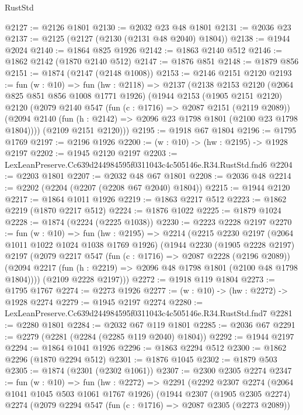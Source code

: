 \begin{lexlean}{RustStd}
\begin{coremodule}
@2127 := @2126 @1801
@2130 := @2032 @23 @48 @1801
@2131 := @2036 @23
@2137 := @2125 (@2127 (@2130 (@2131 @48 @2040) @1804))
@2138 := @1944 @2024
@2140 := @1864 @825 @1926
@2142 := @1863 @2140 @512
@2146 := @1862 @2142 (@1870 @2140 @512)
@2147 := @1876 @851
@2148 := @1879 @856
@2151 := @1874 (@2147 (@2148 @1008))
@2153 := @2146 @2151 @2120
@2193 := fun (w : @10) =>
  fun (hw : @2118) =>
  @2137
    (@2138
      @2153
      @2120
      (@2064 @825 @851 @856 @1008 @1771 @1926)
      (@1944
        @2153
        (@1905 @2151 @2120)
        @2120
        (@2079
          @2140
          @547
          (fun (c : @1716) => @2087 @2151 (@2119 @2089))
          (@2094 @2140 (fun (h : @2142) => @2096 @23 @1798 @1801 (@2100 @23 @1798 @1804))))
        (@2109 @2151 @2120)))
@2195 := @1918 @67 @1804
@2196 := @1795 @1769
@2197 := @2196 @1926
@2200 := (w : @10) -> (hw : @2195) -> @1928 @2197
@2202 := @1945 @2120 @2197
@2203 := LexLeanPreserve.Cc639d244984595f0311043c4c505146e.R34.RustStd.fnd6
@2204 := @2203 @1801
@2207 := @2032 @48 @67 @1801
@2208 := @2036 @48
@2214 := @2202 (@2204 (@2207 (@2208 @67 @2040) @1804))
@2215 := @1944 @2120
@2217 := @1864 @1011 @1926
@2219 := @1863 @2217 @512
@2223 := @1862 @2219 (@1870 @2217 @512)
@2224 := @1876 @1022
@2225 := @1879 @1024
@2228 := @1874 (@2224 (@2225 @1038))
@2230 := @2223 @2228 @2197
@2270 := fun (w : @10) =>
  fun (hw : @2195) =>
  @2214
    (@2215
      @2230
      @2197
      (@2064 @1011 @1022 @1024 @1038 @1769 @1926)
      (@1944
        @2230
        (@1905 @2228 @2197)
        @2197
        (@2079
          @2217
          @547
          (fun (c : @1716) => @2087 @2228 (@2196 @2089))
          (@2094 @2217 (fun (h : @2219) => @2096 @48 @1798 @1801 (@2100 @48 @1798 @1804))))
        (@2109 @2228 @2197)))
@2272 := @1918 @119 @1804
@2273 := @1795 @1767
@2274 := @2273 @1926
@2277 := (w : @10) -> (hw : @2272) -> @1928 @2274
@2279 := @1945 @2197 @2274
@2280 := LexLeanPreserve.Cc639d244984595f0311043c4c505146e.R34.RustStd.fnd7
@2281 := @2280 @1801
@2284 := @2032 @67 @119 @1801
@2285 := @2036 @67
@2291 := @2279 (@2281 (@2284 (@2285 @119 @2040) @1804))
@2292 := @1944 @2197
@2294 := @1864 @1041 @1926
@2296 := @1863 @2294 @512
@2300 := @1862 @2296 (@1870 @2294 @512)
@2301 := @1876 @1045
@2302 := @1879 @503
@2305 := @1874 (@2301 (@2302 @1061))
@2307 := @2300 @2305 @2274
@2347 := fun (w : @10) =>
  fun (hw : @2272) =>
  @2291
    (@2292
      @2307
      @2274
      (@2064 @1041 @1045 @503 @1061 @1767 @1926)
      (@1944
        @2307
        (@1905 @2305 @2274)
        @2274
        (@2079
          @2294
          @547
          (fun (c : @1716) => @2087 @2305 (@2273 @2089))

\end{coremodule}
\end{lexlean}
